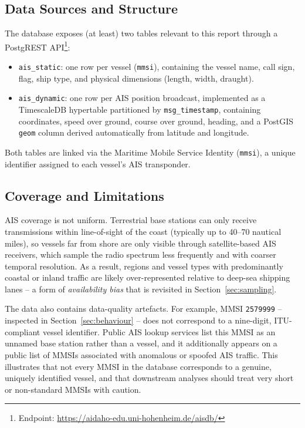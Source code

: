 \documentclass[11pt,a4paper]{article}
\begin{document}
\subsection{Data Sources and Structure}

The database exposes (at least) two tables relevant to this report through a
PostgREST API\footnote{Endpoint: \url{https://aidaho-edu.uni-hohenheim.de/aisdb/}}:

\begin{itemize}[noitemsep]
  \item \texttt{ais\_static}: one row per vessel (\texttt{mmsi}), containing the
        vessel name, call sign, flag, ship type, and physical dimensions
        (length, width, draught).
  \item \texttt{ais\_dynamic}: one row per AIS position broadcast, implemented as
        a TimescaleDB hypertable partitioned by \texttt{msg\_timestamp}, containing
        coordinates, speed over ground, course over ground, heading, and a
        PostGIS \texttt{geom} column derived automatically from latitude and
        longitude.
\end{itemize}

Both tables are linked via the Maritime Mobile Service Identity (\texttt{mmsi}),
a unique identifier assigned to each vessel's AIS transponder.

\subsection{Coverage and Limitations}
\label{sec:limitations}

AIS coverage is not uniform. Terrestrial base stations can only receive
transmissions within line-of-sight of the coast (typically up to 40--70 nautical
miles), so vessels far from shore are only visible through satellite-based AIS
receivers, which sample the radio spectrum less frequently and with coarser
temporal resolution. As a result, regions and vessel types with predominantly
coastal or inland traffic are likely over-represented relative to deep-sea
shipping lanes -- a form of \emph{availability bias} that is revisited in
Section~\ref{sec:sampling}.

The data also contains data-quality artefacts. For example, MMSI \texttt{2579999}
-- inspected in Section~\ref{sec:behaviour} -- does not correspond to a
nine-digit, ITU-compliant vessel identifier. Public AIS lookup services list this
MMSI as an unnamed base station rather than a vessel, and it additionally appears
on a public list of MMSIs associated with anomalous or spoofed AIS traffic. This
illustrates that not every MMSI in the database corresponds to a genuine,
uniquely identified vessel, and that downstream analyses should treat very short
or non-standard MMSIs with caution.
\end{document}
